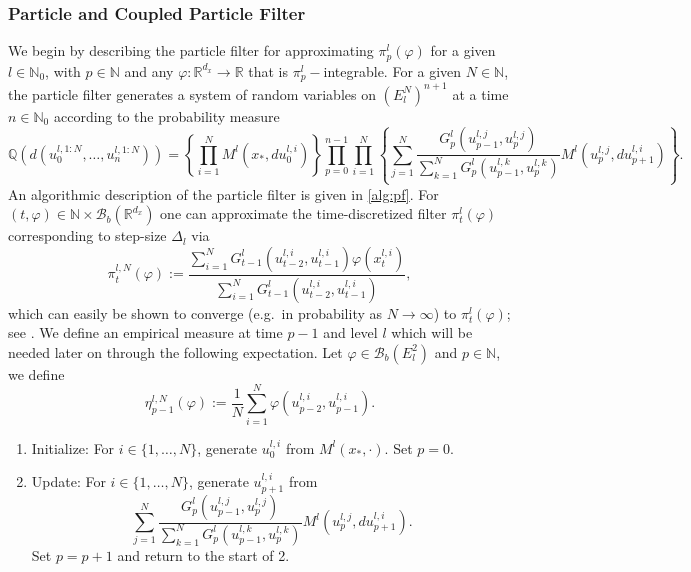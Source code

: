 \documentclass[english]{article}
\begin{document}
\subsubsection{Particle and Coupled Particle Filter}

We begin by describing the particle filter for approximating $\pi_p^l(\varphi)$ for a given $l\in\mathbb{N}_0$, with $p\in\mathbb{N}$ and any $\varphi:\mathbb{R}^{d_x}\rightarrow\mathbb{R}$ that is $\pi_p^l-$integrable. For a given $N\in\mathbb{N}$, the particle filter generates a system of random variables on $(E_l^N)^{n+1}$ at a time $n\in\mathbb{N}_0$ according to the probability measure
$$
\mathbb{Q}(d(u_0^{l,1:N},\dots,u_n^{l,1:N})) = \left\{\prod_{i=1}^N M^l(x_{*},du_0^{l,i})\right\}\prod_{p=0}^{n-1}\prod_{i=1}^N
\left\{\sum_{j=1}^{N}\frac{G_{p}^l(u_{p-1}^{l,j},u_p^{l,j})}{\sum_{k=1}^NG_{p}^l(u_{p-1}^{l,k},u_p^{l,k})} M^l(u_{p}^{l,j},du_{p+1}^{l,i})\right\}.
$$
An algorithmic description of the particle filter is given in \autoref{alg:pf}. For $(t,\varphi)\in\mathbb{N}\times\mathcal{B}_b(\mathbb{R}^{d_x})$ one can approximate the time-discretized filter $\pi_{t}^l(\varphi)$ corresponding to step-size $\Delta_l$ via
\begin{equation}\label{eq:pf_est}
\pi_{t}^{l,N}(\varphi) := \frac{\sum_{i=1}^N G_{t-1}^l(u_{t-2}^{l,i},u_{t-1}^{l,i})\varphi(x_t^{l,i})}{\sum_{i=1}^N G_{t-1}^l(u_{t-2}^{l,i},u_{t-1}^{l,i})},
\end{equation}
which can easily be shown to converge (e.g.~in probability as $N\rightarrow\infty$) to $\pi_{t}^l(\varphi)$; see \cite{delm:2004}.
We define an empirical measure at time $p-1$ and level $l$ which will be needed later on through the following expectation. Let $\varphi\in\mathcal{B}_b(E_l^2)$ and $p\in\mathbb{N}$, we define
\begin{equation}\label{eq:empirical_measure_pred}
\eta_{p-1}^{l,N}(\varphi) := \frac{1}{N}\sum_{i=1}^N \varphi(u_{p-2}^{l,i},u_{p-1}^{l,i}).
\end{equation}


\begin{algorithm}[h!]
\begin{enumerate}
\item{Initialize: For $i\in\{1,\dots,N\}$, generate $u_0^{l,i}$ from $M^l(x_{*},\cdot)$. Set $p=0$.}
\item{Update: For $i\in\{1,\dots,N\}$, generate $u_{p+1}^{l,i}$ from 
$$
\sum_{j=1}^{N}\frac{G_{p}^l(u_{p-1}^{l,j},u_p^{l,j})}{\sum_{k=1}^NG_{p}^l(u_{p-1}^{l,k},u_p^{l,k})} M^l(u_{p}^{l,j},du_{p+1}^{l,i}).
$$
Set $p=p+1$ and return to the start of 2.}
\end{enumerate}
\caption{Particle Filter.}
\label{alg:pf}
\end{algorithm}
\end{document}
